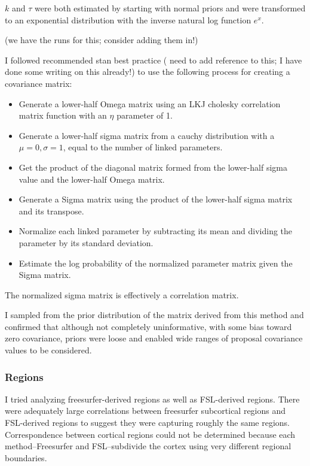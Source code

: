 \documentclass[]{article}
\providecommand{\tightlist}{%
  \setlength{\itemsep}{0pt}\setlength{\parskip}{0pt}}
\begin{document}
\(k\) and \(\tau\) were both estimated by starting with normal priors
and were transformed to an exponential distribution with the inverse
natural log function \(e^x\).

(we have the runs for this; consider adding them in!)

I followed recommended stan best practice ( need to add reference to
this; I have done some writing on this already!) to use the following
process for creating a covariance matrix:

\begin{itemize}
\tightlist
\item
  Generate a lower-half Omega matrix using an LKJ cholesky correlation
  matrix function with an \(\eta\) parameter of 1.
\item
  Generate a lower-half sigma matrix from a cauchy distribution with a
  \(\mu=0, \sigma=1\), equal to the number of linked parameters.
\item
  Get the product of the diagonal matrix formed from the lower-half
  sigma value and the lower-half Omega matrix.
\item
  Generate a Sigma matrix using the product of the lower-half sigma
  matrix and its transpose.
\item
  Normalize each linked parameter by subtracting its mean and dividing
  the parameter by its standard deviation.
\item
  Estimate the log probability of the normalized parameter matrix given
  the Sigma matrix.
\end{itemize}

The normalized sigma matrix is effectively a correlation matrix.

I sampled from the prior distribution of the matrix derived from this
method and confirmed that although not completely uninformative, with
some bias toward zero covariance, priors were loose and enabled wide
ranges of proposal covariance values to be considered.

\subsubsection{Regions}\label{regions}

I tried analyzing freesurfer-derived regions as well as FSL-derived
regions. There were adequately large correlations between freesurfer
subcortical regions and FSL-derived regions to suggest they were
capturing roughly the same regions. Correspondence between cortical
regions could not be determined because each method--Freesurfer and
FSL--subdivide the cortex using very different regional boundaries.
\end{document}
